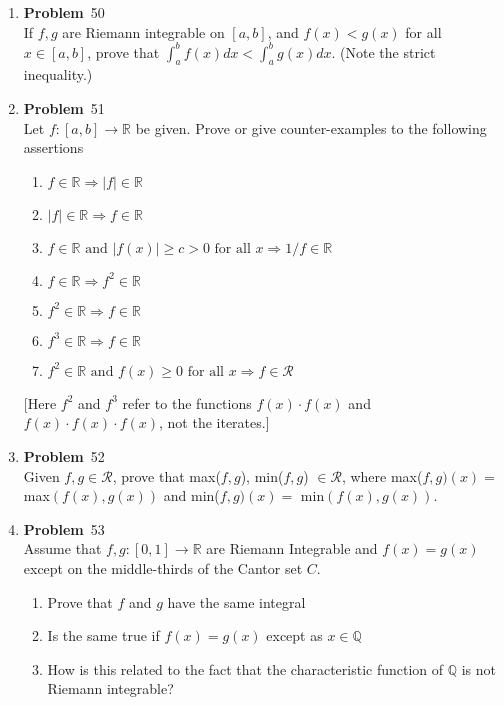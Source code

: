 \documentclass[12pt]{amsart}
\newcommand{\benu}{\begin{enumerate}}
\newcommand{\eenu}{\end{enumerate}}
\theoremstyle{definition}
\newcommand{\mbR}{\mathbb{R}}
\newcommand{\mbQ}{\mathbb{Q}}
\newcommand{\mcR}{\mathcal{R}}
\newcommand{\itep}{\item {\bfseries Problem}\ }
\begin{document}
\begin{enumerate}[series=p]
\newpage
\itep 50\\
If $f,g$ are Riemann integrable on $[a,b]$, and $f(x) < g(x)$ for all $x \in [a,b]$, prove that $\int_{a}^{b} f(x) dx < \int_{a}^{b} g(x) dx$.  (Note the strict inequality.)


\newpage
\itep 51\\
Let $f:[a,b] \to \mbR$ be given.  Prove or give counter-examples to the following assertions
	\benu
		\item $f \in \mbR \Rightarrow |f| \in \mbR$
		\item $|f| \in \mbR \Rightarrow f \in \mbR$
		\item $f \in \mbR \text{ and } |f(x)| \geq c >0 \text{ for all } x \Rightarrow 1/f \in \mbR$
		\item $f \in \mbR \Rightarrow f^2 \in \mbR$
		\item $f^2 \in \mbR \Rightarrow f \in \mbR$
		\item $f^3 \in \mbR \Rightarrow f \in \mbR$
		\item $f^2 \in \mbR \text{ and } f(x) \geq 0 \text{ for all } x \Rightarrow f \in \mcR$
	\eenu
[Here $f^2$ and $f^3$ refer to the functions $f(x) \cdot f(x)$ and $f(x) \cdot f(x) \cdot f(x)$, not the iterates.]


\newpage
\itep 52\\
Given $f, g \in \mcR$, prove that max($f,g$), min($f,g$) $\in \mcR$, where max($f,g)(x) = $ max$(f(x), g(x))$ and min($f,g)(x) = $ min$(f(x), g(x)).$



\newpage
\itep 53\\
Assume that $f,g:[0,1] \to \mbR$ are Riemann Integrable and $f(x) = g(x)$ except on the middle-thirds of the Cantor set $C$.
	\benu
		\item Prove that $f$ and $g$ have the same integral
		\item Is the same true if $f(x) = g(x)$ except as $x \in \mbQ$
		\item How is this related to the fact that the characteristic function of $\mbQ$ is not Riemann integrable?
	\eenu

\end{enumerate}
\end{document}
